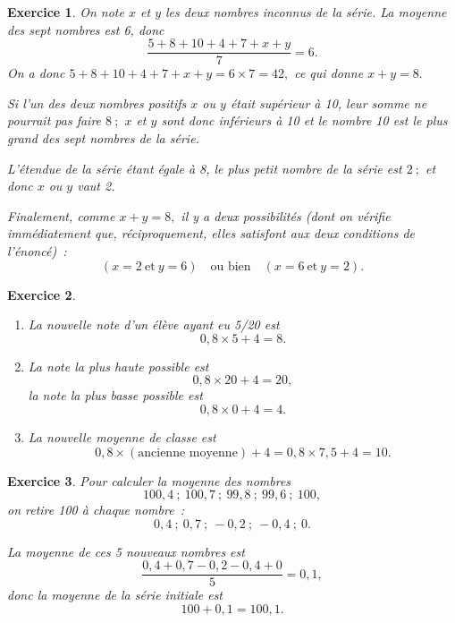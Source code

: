 \documentclass[10pt]{article}
\newtheorem{exo}{Exercice}
\begin{document}
\begin{exo}

On note $x$  et $y$  les deux nombres inconnus de la série.
La moyenne des sept nombres est 6, donc  \[\frac{5+8+10+4+7+x+y}{7}=6.\] On a donc $5+8+10+4+7+x+y=6\times 7 = 42,$ ce qui donne $x+y=8.$

\medskip

Si l'un des deux nombres positifs $x$  ou $y$  était supérieur à 10, leur somme ne pourrait pas faire $8~;$ $x$ et $y$  sont donc inférieurs à 10 et le nombre 10 est le plus grand des sept nombres de la série.

\medskip


L'étendue de la série étant égale à 8, le plus petit nombre de la série est $2~;$ et donc  $x$ ou $y$  vaut 2.

\medskip

Finalement, comme $x+y=8,$ il y a deux possibilités (dont on vérifie immédiatement que, réciproquement, elles satisfont aux deux conditions de l'énoncé)~:
\[\left(x=2~\text{et}~y=6\right)\quad\text{ou bien}\quad\left(x=6~\text{et}~y=2\right).\]


\end{exo}



\begin{exo}

\begin{enumerate}
\item La nouvelle note d'un élève ayant eu 5/20 est 
\[0,8\times 5+4=8.\]
\item La note la plus haute possible est \[0,8\times 20+4=20,\] la note la plus basse possible est
\[0,8\times 0+4=4.\]
\item La nouvelle moyenne de classe est
\[0,8\times (\text{ancienne moyenne})+4=0,8\times 7,5+4=10.\]
\end{enumerate}

\end{exo}

\begin{exo}


Pour calculer la moyenne des nombres
\[100,4 ~;~100,7 ~;~ 99,8 ~;~ 99,6 ~;~ 100, \]
on retire 100 à chaque nombre~:
\[0,4 ~;~ 0,7 ~;~ -0,2 ~;~ -0,4 ~;~ 0.\]

La moyenne de ces 5 nouveaux nombres est 
\[\frac{0,4+0,7-0,2-0,4+0}{5}=0,1,\] donc la moyenne de la série initiale est
\[100+0,1=100,1.\]


\end{exo}
\end{document}

